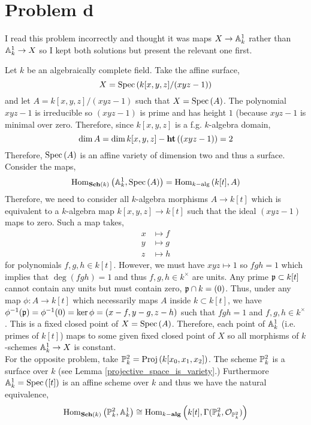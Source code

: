 \documentclass[12pt]{article}
\begin{document}
\section{Problem d}

\begin{remark}
I read this problem incorrectly and thought it was maps $X \to \A^1_k$ rather than $\A^1_k \to X$ so I kept both solutions but present the relevant one first.
\end{remark}

Let $k$ be an algebraically complete field. Take the affine surface,
\[ X = \Spec{k[x, y, z]/(xyz - 1)} \]
and let $A = k[x, y, z]/(xyz - 1)$ such that $X = \Spec{A}$. The polynomial $xyz - 1$ is irreducible so $(xyz - 1)$ is prime and has height $1$ (because $xyz - 1$ is minimal over zero. Therefore, since $k[x, y, z]$ is a f.g. $k$-algebra domain,
\[ \dim{A} = \dim{k[x, y, z]} - \height{(xyz - 1)} = 2 \]
Therefore, $\Spec{A}$ is an affine variety of dimension two and thus a surface. 
Consider the maps,
\[ \Homover{\Sch(k)}{\A_k^1}{\Spec{A}} = \Homover{k-\text{alg}}{k[t]}{A} \]
Therefore, we need to consider all $k$-algebra morphisms $A  \to k[t]$ which is equivalent to a $k$-algebra map $k[x, y, z] \to k[t]$ such that the ideal $(xyz - 1)$ maps to zero. Such a map takes,
\begin{align*}
x & \mapsto f
\\
y & \mapsto g
\\
z & \mapsto h
\end{align*}
for polynomials $f,g,h \in k[t]$. However, we must have $xyz \mapsto 1$ so $fgh = 1$ which implies that $\deg{(fgh)} = 1$ and thus $f,g,h \in k^\times$ are units. Any prime $\p \subset k[t]$ cannot contain any units but must contain zero, $\p \cap k = (0)$. Thus, under any map $\phi : A \to k[t]$ which necessarily maps $A$ inside $k \subset k[t]$, we have $\phi^{-1}(\p) = \phi^{-1}(0) = \ker{\phi} = (x - f, y - g, z - h)$ such that $fgh = 1$ and $f,g,h \in k^\times$. This is a fixed closed point of $X = \Spec{A}$. Therefore, each point of $\A^1_k$ (i.e. primes of $k[t]$) maps to some given fixed closed point of $X$ so all morphisms of $k$-schemes $\A^1_k \to X$ is constant.    
\bigskip\\
For the opposite problem, take $\P^2_k = \Proj{k[x_0, x_1, x_2]}$. The scheme $\P^2_k$ is a surface over $k$ (see Lemma \ref{projective_space_is_variety}.) Furthermore $\mathbb{A}^1_k = \Spec{[t]}$ is an affine scheme over $k$ and thus we have the natural equivalence,
\[ \Homover{\mathbf{Sch}(k)}{\P^2_k}{\mathbb{A}^1_k} \cong \Homover{k-\mathbf{alg}}{k[t]}{\Gamma(\P^2_k, \struct{\P^2_k})} \]
\end{document}
